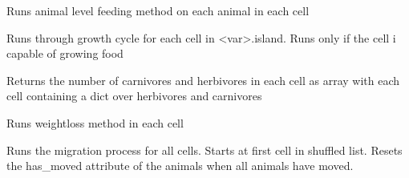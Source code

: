 \documentclass[a4paper,10pt,openany,oneside]{sphinxmanual}
\begin{document}
\begin{fulllineitems}

\begin{fulllineitems}
\label{island:biosim.island.Island.feeding}
Runs animal level feeding method on each animal in each cell

\end{fulllineitems}


\begin{fulllineitems}
\label{island:biosim.island.Island.grow}
Runs through growth cycle for each cell in \textless{}var\textgreater{}.island.
Runs only if the cell i capable of growing food

\end{fulllineitems}


\begin{fulllineitems}
\label{island:biosim.island.Island.individuals}
Returns the number of carnivores and herbivores in each cell
as array with each cell containing a dict over herbivores and carnivores

\end{fulllineitems}


\begin{fulllineitems}
\label{island:biosim.island.Island.loss_of_weight}
Runs weightloss method in each cell

\end{fulllineitems}


\begin{fulllineitems}
\label{island:biosim.island.Island.migration}
Runs the migration process for all cells. Starts at first cell in
shuffled list. Resets the has\_moved attribute of the animals when
all animals have moved.

\end{fulllineitems}



\end{fulllineitems}
\end{document}
